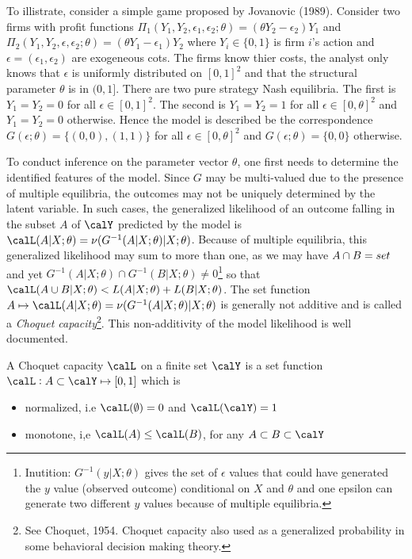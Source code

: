 \begin{example}
	\label{ex:GH-1}
	To illistrate, consider a simple game proposed by Jovanovic (1989). Consider two firms with profit functions $\Pi_1(Y_1, Y_2, \epsilon_1, \epsilon_2;\theta)= (\theta Y_2 - \epsilon_2)Y_1$ and $\Pi_2(Y_1, Y_2, \epsilon, \epsilon_2; \theta) = (\theta Y_1 - \epsilon_1)Y_2$ where $Y_i \in \{0,1\}$ is firm $i$'s action and $\epsilon = (\epsilon_1, \epsilon_2)$ are exogeneous cots. The firms know thier costs, the analyst only knows that $\epsilon$ is uniformly distributed on $[0,1]^2$ and that the structural parameter $\theta$ is in $(0,1]$. There are two pure strategy Nash equilibria. The first is $Y_1 = Y_2 = 0$ for all $\epsilon \in [0,1]^2$.  The second is $Y_1 = Y_2 = 1$ for all $\epsilon \in [0,\theta]^2$ and $Y_1 = Y_2 = 0$ otherwise. Hence the model is described be the correspondence $G(\epsilon; \theta) = \{(0,0),(1,1)\}$ for all $\epsilon \in [0,\theta]^2$ and $G(\epsilon;\theta) = \{0,0\}$ otherwise.
\end{example}

To conduct inference on the parameter vector $\theta$, one first needs to determine the identified features of the model. Since $G$ may be multi-valued due to the presence of multiple equilibria, the outcomes may not be uniquely determined by the latent variable. In such cases, the generalized likelihood of an outcome falling in the subset $A$ of $\calY$ predicted by the model is $\calL(A|X;\theta) = \nu(G^{-1}(A|X;\theta)|X;\theta)$. Because of multiple equilibria, this generalized likelihood may sum to more than one, as we may have $A\cap B = \null set$ and yet $G^{-1}(A | X;\theta) \cap G^{-1}(B|X;\theta) \neq 0$\footnote{Inutition: $G^{-1}(y|X;\theta)$ gives the set of $\epsilon$ values that could have generated the $y$ value (observed outcome) conditional on $X$ and $\theta$ and one epsilon can generate two different $y$ values because of multiple equilibria.} so that $\calL(A\cup B | X;\theta) < L(A|X;\theta) + L(B|X;\theta)$. The set function $A\mapsto \calL(A|X;\theta) = \nu(G^{-1}(A|X;\theta)|X;\theta)$ is generally not additive and is called a \textit{Choquet capacity}\footnote{See Choquet, 1954. Choquet capacity also used as a generalized probability in some behavioral decision making theory.}. This non-additivity of the model likelihood is well documented.

\begin{definition}
	\label{def:GH-1}
	A Choquet capacity $\calL$ on a finite set $\calY$ is a set function $\calL: A\subset\calY\mapsto[0,1]$ which is
	\begin{itemize}
		\item normalized, i.e $\calL(\emptyset) = 0$ and $\calL(\calY) = 1$
		\item monotone, i,e $\calL(A) \leq \calL(B)$, for any $A\subset B\subset \calY$
	\end{itemize}
\end{definition}

